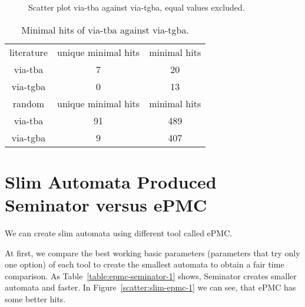 \documentclass[
	digital,
nolof, nolot
]{fithesis3}
\begin{document}
		\begin{figure}[ht]
			\centering
			
		\caption{Scatter plot via-tba against via-tgba, equal values excluded. }
		\label{scatter:tba-tgba}
		\begin{tikzpicture}
			
		\end{tikzpicture}
		\end{figure}
		
		 
		\begin{table}[ht]
			
			\centering
			\caption{Minimal hits of via-tba against via-tgba.}
			\label{table:tba-tgba-min-hits}
			\begin{tabular}{ |c||c|c| } 
				\hline
				literature&unique minimal hits&minimal hits\\
				\hhline{|===|}
				via-tba&7 & 20\\
				\hline
				via-tgba&0 & 13\\ 
				\hline
				\hline
				random&unique minimal hits&minimal hits\\
				\hhline{|===|}
				via-tba&91 & 489\\
				\hline
				via-tgba&9 & 407\\ 
				\hline
			\end{tabular}
		\end{table}
	\clearpage
		\section{Slim Automata Produced Seminator versus ePMC}
		We can create slim automata using different tool called ePMC.
		
		At first, we compare the best working basic parameters (parameters that try only one option) of each tool to create the smallest automata to obtain a fair time comparison.
		As Table~\ref{table:epmc-seminator-1} shows, Seminator creates smaller automata and faster. In Figure~\ref{scatter:slim-epmc-1} we can see, that ePMC has some better hits.
	
\end{document}
